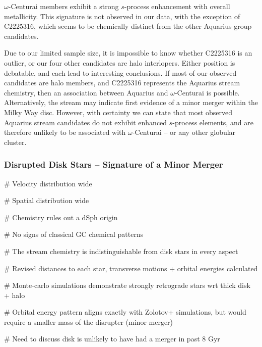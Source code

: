 \documentclass{emulateapj}
\begin{document}
$\omega$-Centurai members exhibit a strong $s$-process enhancement with overall metallicity. This signature is not observed in our data, with the exception of C2225316, which seems to be chemically distinct from the other Aquarius group candidates.





Due to our limited sample size, it is impossible to know whether C2225316 is an outlier, or our four other candidates are halo interlopers. Either position is debatable, and each lead to interesting conclusions. If most of our observed candidates are halo members, and C2225316 represents the Aquarius stream chemistry, then an association between Aquarius and $\omega$-Centurai is possible. Alternatively, the stream may indicate first evidence of a minor merger within the Milky Way disc. However, with certainty we can state that most observed Aquarius stream candidates do not exhibit enhanced $s$-process elements, and are therefore unlikely to be associated with $\omega$-Centurai \--- or any other globular cluster.




 

\subsubsection{Disrupted Disk Stars \--- Signature of a Minor Merger}

\# Velocity distribution wide

\# Spatial distribution wide

\# Chemistry rules out a dSph origin

\# No signs of classical GC chemical patterns

\# The stream chemistry is indistinguishable from disk stars in every aspect

\# Revised distances to each star, transverse motions + orbital energies calculated

\# Monte-carlo simulations demonstrate strongly retrograde stars wrt thick disk + halo

\# Orbital energy pattern aligns exactly with Zolotov+ simulations, but would require a smaller mass of the disrupter (minor merger)

\# Need to discuss disk is unlikely to have had a merger in past 8 Gyr

\end{document}
